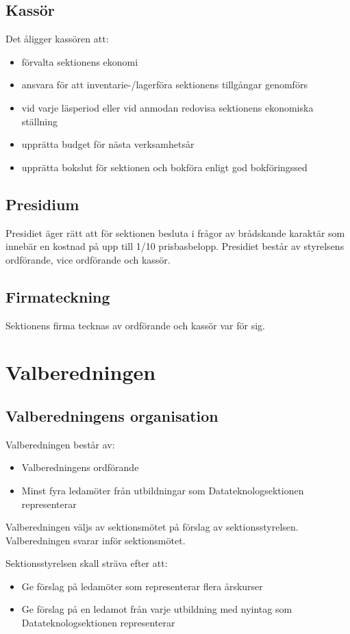 \documentclass{datateknologsektionen-document}
\begin{document}
\subsection{Kassör}
Det åligger kassören att:
\begin{itemize}
  \item förvalta sektionens ekonomi
  \item ansvara för att inventarie-/lagerföra sektionens tillgångar genomförs
  \item vid varje läsperiod eller vid anmodan redovisa sektionens ekonomiska ställning
  \item upprätta budget för nästa verksamhetsår
  \item upprätta bokslut för sektionen och bokföra enligt god bokföringssed
\end{itemize}

\subsection{Presidium}
Presidiet äger rätt att för sektionen besluta i frågor av brådskande karaktär som
innebär en kostnad på upp till 1/10 prisbasbelopp. Presidiet består av styrelsens
ordförande, vice ordförande och kassör.

\subsection{Firmateckning}
Sektionens firma tecknas av ordförande och kassör var för sig.

\section{Valberedningen}
\subsection{Valberedningens organisation}
Valberedningen består av:
\begin{itemize}
  \item Valberedningens ordförande
  \item Minst fyra ledamöter från utbildningar som Datateknologsektionen representerar
\end{itemize}

Valberedningen väljs av sektionsmötet på förslag av sektionsstyrelsen. Valberedningen
svarar inför sektionsmötet.

Sektionsstyrelsen skall sträva efter att:
\begin{itemize}
  \item Ge förslag på ledamöter som representerar flera årskurser
  \item Ge förslag på en ledamot från varje utbildning med nyintag som Datateknologsektionen representerar
\end{itemize}
\end{document}
